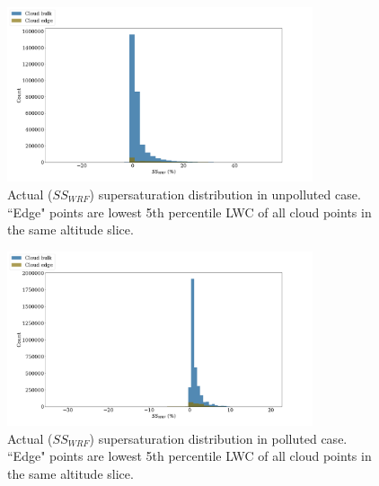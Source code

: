 \documentclass{article}
\begin{document}
\begin{figure}[ht]
    \centering
    \includegraphics[width=9cm]{mywrf/v13_inclrain_and_vent_bulkedge_hist_Unpolluted_figure.png}
    \caption{Actual ($SS_{WRF}$) supersaturation distribution in unpolluted case. ``Edge" points are lowest 5th percentile LWC of all cloud points in the same altitude slice.}
    \label{wrfsshistunpoll}
\end{figure}
\begin{figure}[ht]
    \centering
    \includegraphics[width=9cm]{mywrf/v13_inclrain_and_vent_bulkedge_hist_Polluted_figure.png}
    \caption{Actual ($SS_{WRF}$) supersaturation distribution in polluted case. ``Edge" points are lowest 5th percentile LWC of all cloud points in the same altitude slice.}
    \label{wrfsshistpoll}
\end{figure}
\end{document}
